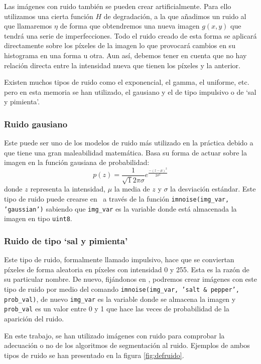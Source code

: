 Las imágenes con ruido también se pueden crear artificialmente. Para ello utilizamos una cierta función $H$ de degradación, a la que añadimos un ruido al que llamaremos $\eta$ de forma que obtendremos una nueva imagen $g(x,y)$ que tendrá una serie de imperfecciones. Todo el ruido creado de esta forma se aplicará directamente sobre los píxeles de la imagen lo que provocará cambios en su histograma en una forma u otra. Aun así, debemos tener en cuenta que no hay relación directa entre la intensidad nueva que tienen los píxeles y la anterior. 

Existen muchos tipos de ruido como el exponencial, el gamma, el uniforme, etc. pero en esta memoria se han utilizado, el gausiano y el de tipo impulsivo o de `sal y pimienta'.

\subsubsection{Ruido gausiano}
Este puede ser uno de los modelos de ruido más utilizado en la práctica debido a que tiene una gran maleabilidad matemática. Basa su forma de actuar sobre la imagen en la función gausiana de probabilidad:
$$p(z) = \frac{1}{\sqrt{1}{2\pi\sigma}} e^\frac{-(z-\mu)^2}{2\sigma^2}$$
donde $z$ representa la intensidad, $\mu$ la media de $z$ y $\sigma$ la desviación estándar. Este tipo de ruido puede crearse en \MATLAB\ a través de la función \texttt{imnoise(img_var, 'gaussian')} sabiendo que \texttt{img_var} es la variable donde está almacenada la imagen en tipo \texttt{uint8}.

\subsubsection{Ruido de tipo `sal y pimienta'}
Este tipo de ruido, formalmente llamado impulsivo, hace que se conviertan píxeles de forma aleatoria en píxeles con intensidad 0 y 255. Esta es la razón de su particular nombre. De nuevo, fijándonos en \MATLAB, podremos crear imágenes con este tipo de ruido por medio del comando \texttt{imnoise(img_var, 'salt & pepper', prob_val)}, de nuevo \texttt{img_var} es la variable donde se almacena la imagen y \texttt{prob_val} es un valor entre 0 y 1 que hace las veces de probabilidad de la aparición del ruido. 

En este trabajo, se han utilizado imágenes con ruido para comprobar la adecuación o no de los algoritmos de segmentación al ruido. Ejemplos de ambos tipos de ruido se han presentado en la figura \ref{fig:defruido}.